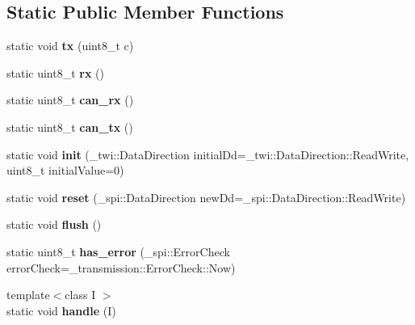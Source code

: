 \subsection*{Static Public Member Functions}
\begin{DoxyCompactItemize}
\item 
static void {\bfseries tx} (uint8\+\_\+t c)\hypertarget{classTwiMaster_af776b246fea206cfbc1a9119ca3781ee}{}\label{classTwiMaster_af776b246fea206cfbc1a9119ca3781ee}

\item 
static uint8\+\_\+t {\bfseries rx} ()\hypertarget{classTwiMaster_a8f36cf2b7036472f1a0122d0d9821998}{}\label{classTwiMaster_a8f36cf2b7036472f1a0122d0d9821998}

\item 
static uint8\+\_\+t {\bfseries can\+\_\+rx} ()\hypertarget{classTwiMaster_aad636e5ed8565f8fa8021b296a1b42e0}{}\label{classTwiMaster_aad636e5ed8565f8fa8021b296a1b42e0}

\item 
static uint8\+\_\+t {\bfseries can\+\_\+tx} ()\hypertarget{classTwiMaster_a4f1b0dc15dbe2cc2806409c81fba3f1d}{}\label{classTwiMaster_a4f1b0dc15dbe2cc2806409c81fba3f1d}

\item 
static void {\bfseries init} (\+\_\+twi\+::\+Data\+Direction initial\+Dd=\+\_\+twi\+::\+Data\+Direction\+::\+Read\+Write, uint8\+\_\+t initial\+Value=0)\hypertarget{classTwiMaster_ac1bf8233b8e041d2ff4524915de30902}{}\label{classTwiMaster_ac1bf8233b8e041d2ff4524915de30902}

\item 
static void {\bfseries reset} (\+\_\+spi\+::\+Data\+Direction new\+Dd=\+\_\+spi\+::\+Data\+Direction\+::\+Read\+Write)\hypertarget{classTwiMaster_a13f0e087f9959af68c0c3bc51cd477ab}{}\label{classTwiMaster_a13f0e087f9959af68c0c3bc51cd477ab}

\item 
static void {\bfseries flush} ()\hypertarget{classTwiMaster_a820c9e3f978761f3fcfc6c47ec23b873}{}\label{classTwiMaster_a820c9e3f978761f3fcfc6c47ec23b873}

\item 
static uint8\+\_\+t {\bfseries has\+\_\+error} (\+\_\+spi\+::\+Error\+Check error\+Check=\+\_\+transmission\+::\+Error\+Check\+::\+Now)\hypertarget{classTwiMaster_ab0b45aca23e9cca74eab03699b13c6c5}{}\label{classTwiMaster_ab0b45aca23e9cca74eab03699b13c6c5}

\item 
{\footnotesize template$<$class I $>$ }\\static void {\bfseries handle} (I)\hypertarget{classTwiMaster_a237d5394a8d9a15edfabd29ea9e3e17f}{}\label{classTwiMaster_a237d5394a8d9a15edfabd29ea9e3e17f}


\end{DoxyCompactItemize}
